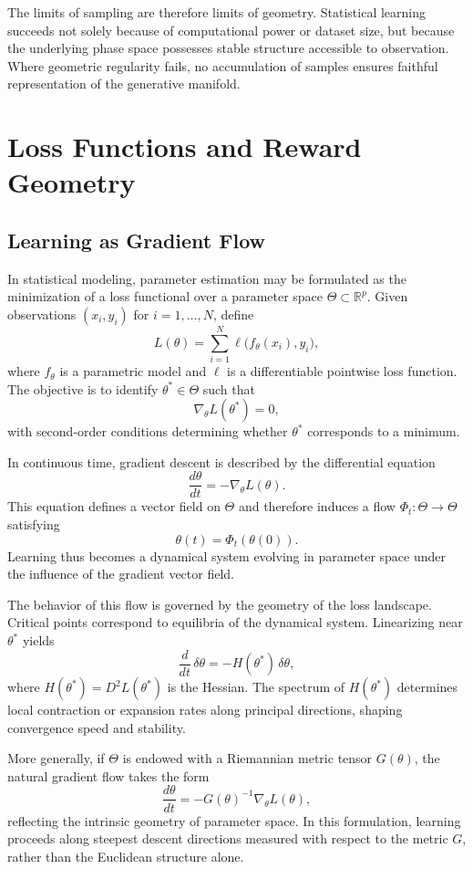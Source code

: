 \documentclass[12pt]{book}
\begin{document}
The limits of sampling are therefore limits of geometry. Statistical learning succeeds not solely because of computational power or dataset size, but because the underlying phase space possesses stable structure accessible to observation. Where geometric regularity fails, no accumulation of samples ensures faithful representation of the generative manifold.

\chapter{Loss Functions and Reward Geometry}

\section{Learning as Gradient Flow}

In statistical modeling, parameter estimation may be formulated as the minimization of a loss functional over a parameter space $\Theta \subset \mathbb{R}^p$. Given observations $(x_i, y_i)$ for $i=1,\dots,N$, define
\[
L(\theta)
=
\sum_{i=1}^{N}
\ell\big(f_\theta(x_i), y_i\big),
\]
where $f_\theta$ is a parametric model and $\ell$ is a differentiable pointwise loss function. The objective is to identify $\theta^\ast \in \Theta$ such that
\[
\nabla_\theta L(\theta^\ast) = 0,
\]
with second-order conditions determining whether $\theta^\ast$ corresponds to a minimum.

In continuous time, gradient descent is described by the differential equation
\[
\frac{d\theta}{dt}
=
-
\nabla_\theta L(\theta).
\]
This equation defines a vector field on $\Theta$ and therefore induces a flow $\Phi_t : \Theta \to \Theta$ satisfying
\[
\theta(t) = \Phi_t(\theta(0)).
\]
Learning thus becomes a dynamical system evolving in parameter space under the influence of the gradient vector field.

The behavior of this flow is governed by the geometry of the loss landscape. Critical points correspond to equilibria of the dynamical system. Linearizing near $\theta^\ast$ yields
\[
\frac{d}{dt}\,\delta\theta
=
-
H(\theta^\ast)\,\delta\theta,
\]
where $H(\theta^\ast)=D^2 L(\theta^\ast)$ is the Hessian. The spectrum of $H(\theta^\ast)$ determines local contraction or expansion rates along principal directions, shaping convergence speed and stability.

More generally, if $\Theta$ is endowed with a Riemannian metric tensor $G(\theta)$, the natural gradient flow takes the form
\[
\frac{d\theta}{dt}
=
-
G(\theta)^{-1}
\nabla_\theta L(\theta),
\]
reflecting the intrinsic geometry of parameter space. In this formulation, learning proceeds along steepest descent directions measured with respect to the metric $G$, rather than the Euclidean structure alone.
\end{document}
